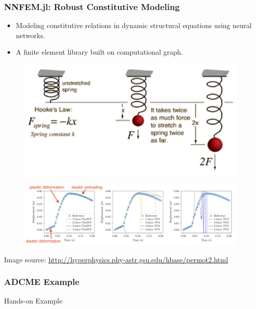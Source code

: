 \documentclass{beamer}
\begin{document}
\begin{frame}
	\frametitle{NNFEM.jl: Robust Constitutive Modeling}
	\begin{itemize}
	\item Modeling constitutive relations in dynamic structural equations using neural networks. 
	\item A finite element library built on computational graph. 

	\end{itemize}

\begin{center}
	\begin{minipage}[t]{0.48\textwidth}
\begin{figure}[hbt]
\centering
  \includegraphics[width=1.0\textwidth]{figures/hook}
\end{figure}
\end{minipage}
\begin{minipage}[t]{0.48\textwidth}	
\begin{figure}[hbt]
\centering
  \includegraphics[width=1.0\textwidth]{figures/nncons}
\end{figure}
\end{minipage}
\end{center}


{\scriptsize Image source: \url{http://hyperphysics.phy-astr.gsu.edu/hbase/permot2.html}}
\end{frame}

\begin{frame}
	\frametitle{ADCME Example}
	\begin{center}
		Hands-on Example
	\end{center}
\end{frame}
\end{document}
